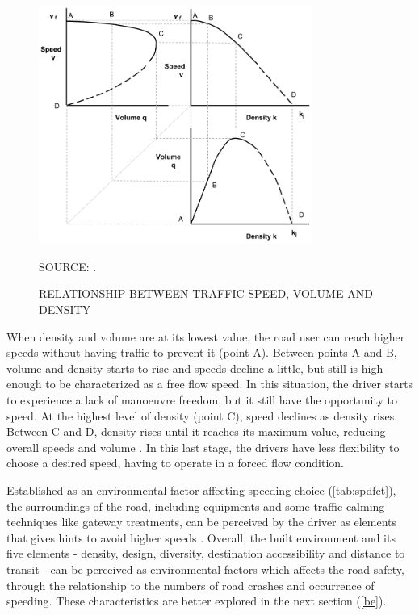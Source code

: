 \begin{figure}[!htbp]
    \centering\footnotesize
    \captionsetup{font=footnotesize}
    \caption{RELATIONSHIP BETWEEN TRAFFIC SPEED, VOLUME AND DENSITY}
    \includegraphics[width=0.8\textwidth]{fig/svd.png}
    \label{fig:svd}
    \par SOURCE: \textcite{Green2020}.
\end{figure}

When density and volume are at its lowest value, the road user can reach higher speeds without having traffic to prevent it (point A). Between points A and B, volume and density starts to rise and speeds decline a little, but still is high enough to be characterized as a free flow speed. In this situation, the driver starts to experience a lack of manoeuvre freedom, but it still have the opportunity to speed. At the highest level of density (point C), speed declines as density rises. Between C and D, density rises until it reaches its maximum value, reducing overall speeds and volume \cite{Green2020}. In this last stage, the drivers have less flexibility to choose a desired speed, having to operate in a forced flow condition. 



Established as an environmental factor affecting speeding choice (\autoref{tab:spdfct}), the surroundings of the road, including equipments and some traffic calming techniques like gateway treatments, can be perceived by the driver as elements that gives hints to avoid higher speeds \cite{WHO2008}. Overall, the built environment and its five elements - density, design, diversity, destination accessibility and distance to transit - can be perceived as environmental factors which affects the road safety, through the relationship to the numbers of road crashes and occurrence of speeding. These characteristics are better explored in the next section (\ref{be}). 

